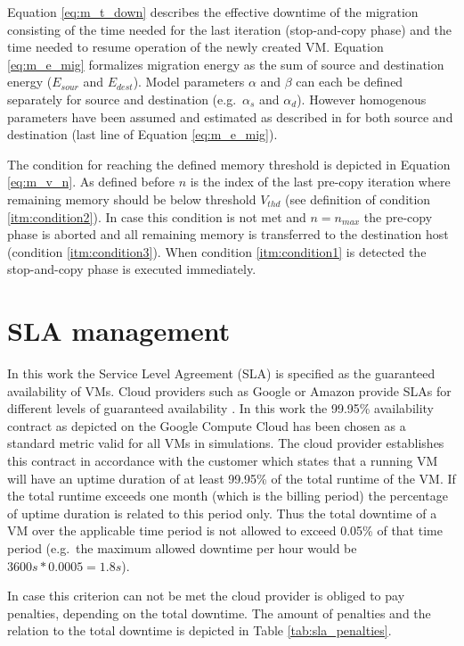 Equation \ref{eq:m_t_down} describes the effective downtime of the migration consisting of the time needed for the last iteration (stop-and-copy phase) and the time needed to resume operation of the newly created VM. Equation \ref{eq:m_e_mig} formalizes migration energy as the sum of source and destination energy ($E_{sour}$ and $E_{dest}$). Model parameters $\alpha$ and $\beta$ can each be defined separately for source and destination (e.g.~$\alpha_s$ and $\alpha_d$). However homogenous parameters have been assumed and estimated as described in \cite{liu2013performance} for both source and destination (last line of Equation \ref{eq:m_e_mig}). 

The condition for reaching the defined memory threshold is depicted in Equation \ref{eq:m_v_n}. As defined before $n$ is the index of the last pre-copy iteration where remaining memory should be below threshold $V_{thd}$ (see definition of condition \ref{itm:condition2}). In case this condition is not met and $n = n_{max}$ the pre-copy phase is aborted and all remaining memory is transferred to the destination host (condition \ref{itm:condition3}). When condition \ref{itm:condition1} is detected the stop-and-copy phase is executed immediately. 




\section{SLA management} \label{sec:sla_managemenet}

In this work the Service Level Agreement (SLA) is specified as the guaranteed availability of VMs. Cloud providers such as Google or Amazon provide SLAs for different levels of guaranteed availability \cite{google2015compute, amazon2013sla}. In this work the 99.95\% availability contract as depicted on the Google Compute Cloud \cite{google2015compute} has been chosen as a standard metric valid for all VMs in simulations. The cloud provider establishes this contract in accordance with the customer which states that a running VM will have an uptime duration of at least 99.95\% of the total runtime of the VM. If the total runtime exceeds one month (which is the billing period) the percentage of uptime duration is related to this period only. Thus the total downtime of a VM over the applicable time period is not allowed to exceed 0.05\% of that time period (e.g.~the maximum allowed downtime per hour would be $3600s * 0.0005 = 1.8s$). 

In case this criterion can not be met the cloud provider is obliged to pay penalties, depending on the total downtime. The amount of penalties and the relation to the total downtime is depicted in Table \ref{tab:sla_penalties}. 


